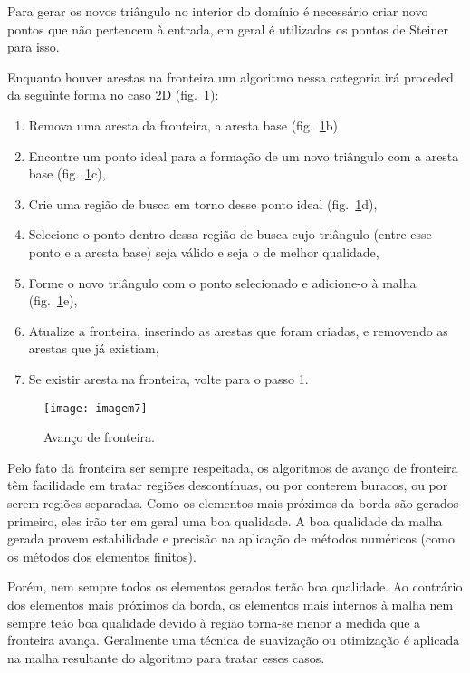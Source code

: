 Para gerar os novos triângulo no interior do domínio é necessário criar novo pontos que não pertencem à entrada, em geral é utilizados os pontos de Steiner para isso.

Enquanto houver arestas na fronteira um algoritmo nessa categoria irá proceded da seguinte forma no caso 2D (fig.~\ref{fig:imagem7}):
 
 \begin{enumerate}
\item{ Remova uma aresta da fronteira, a aresta base (fig.~\ref{fig:imagem7}b)}
\item{ Encontre um ponto ideal para a formação de um novo triângulo com a aresta base (fig.~\ref{fig:imagem7}c),}
\item{ Crie uma região de busca em torno desse ponto ideal (fig.~\ref{fig:imagem7}d),}
\item{ Selecione o ponto dentro dessa região de busca cujo triângulo (entre esse ponto e a aresta base) seja válido e seja o de melhor qualidade,}
\item{ Forme o novo triângulo com o ponto selecionado e adicione-o à malha (fig.~\ref{fig:imagem7}e),}
\item{ Atualize a fronteira, inserindo as arestas que foram criadas, e removendo as arestas que já existiam,}
\item{ Se existir aresta na fronteira, volte para o passo 1.}
\end{enumerate}

 \begin{figure}[htbp]
     \centering
     \texttt{[image: imagem7]}
     \caption{Avanço de fronteira. \cite{bib:Freitas10}} 
     \label{fig:imagem7}
 \end{figure}

 Pelo fato da fronteira ser sempre respeitada, os algoritmos de avanço de fronteira têm facilidade em tratar regiões descontínuas, ou por conterem buracos, ou por serem regiões separadas. Como os elementos mais próximos da borda são gerados primeiro, eles irão ter em geral uma boa qualidade. A boa qualidade da malha gerada provem estabilidade e precisão na aplicação de métodos numéricos (como os métodos dos elementos finitos).

Porém, nem sempre todos os elementos gerados terão boa qualidade. Ao contrário dos elementos mais próximos da borda, os elementos mais internos à malha nem sempre teão boa qualidade devido à região torna-se menor a medida que a fronteira avança. Geralmente uma técnica de suavização ou otimização é aplicada na malha resultante do algoritmo para tratar esses casos.
